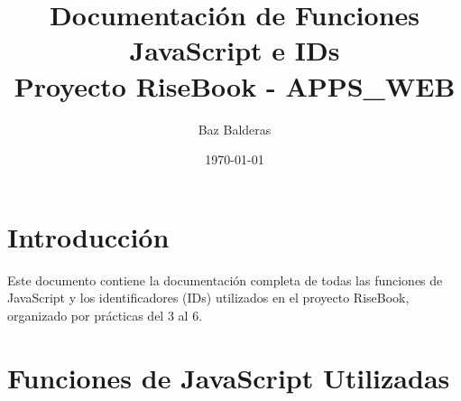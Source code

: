 \documentclass[12pt,a4paper]{article}
\title{\textbf{Documentación de Funciones JavaScript e IDs\\Proyecto RiseBook - APPS\_WEB}}
\author{Baz Balderas}
\date{\today}
\begin{document}
\maketitle

\section{Introducción}
Este documento contiene la documentación completa de todas las funciones de JavaScript y los identificadores (IDs) utilizados en el proyecto RiseBook, organizado por prácticas del 3 al 6.

\section{Funciones de JavaScript Utilizadas}
\end{document}
